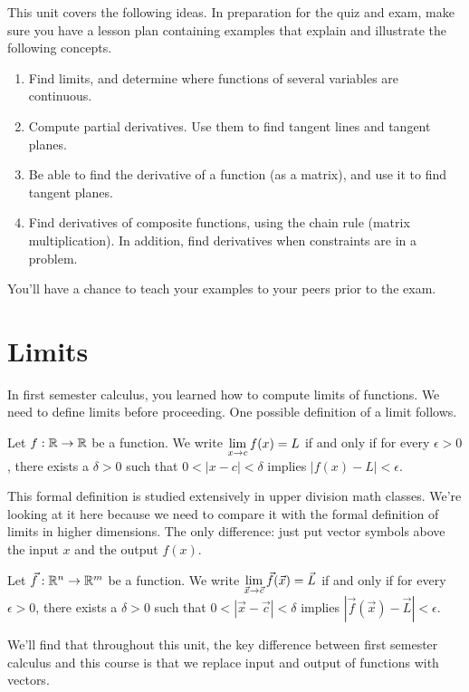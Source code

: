 \newcommand{\derivativehomeworklink}[1]{\href{http://db.tt/cSeKG8XO}{#1}}%
%
%
\noindent 
This unit covers the following ideas. In preparation for the quiz and exam, make sure you have a lesson plan containing examples that explain and illustrate the following concepts.  
\begin{enumerate}
\item Find limits, and determine where functions of several variables are continuous.
\item Compute partial derivatives.  Use them to find tangent lines and tangent planes.
\item Be able to find the derivative of a function (as a matrix), and use it to find tangent planes.
\item Find derivatives of composite functions, using the chain rule (matrix multiplication). In addition, find derivatives when constraints are in a problem.
\end{enumerate}
You'll have a chance to teach your examples to your peers prior to the exam.

\section{Limits}
In first semester calculus, you learned how to compute limits of functions. We need to define limits before proceeding. One possible definition of a limit follows.
\begin{definition}
 Let $f:\mathbb{R}\to\mathbb{R}$ be a function.
 We write $\displaystyle \lim_{x\to c} f(x)=L$ if and only if for every $\epsilon>0$, there exists a $\delta>0$ such that $0<|x-c|<\delta$ implies $|f(x)-L|<\epsilon$.
\end{definition}
 This formal definition is studied extensively in upper division math classes. We're looking at it here because we need to compare it with the formal definition of limits in higher dimensions. The only difference: just put vector symbols above the input $x$ and the output $f(x)$.
\begin{definition}
 Let $\vec f:\mathbb{R}^n\to\mathbb{R}^m$ be a function.
 We write $\displaystyle \lim_{\vec x\to \vec c} \vec f(\vec x)=\vec L$ if and only if for every $\epsilon>0$, there exists a $\delta>0$ such that $0<|\vec x-\vec c|<\delta$ implies $|\vec f(\vec x)-\vec L|<\epsilon$.
\end{definition}
We'll find that throughout this unit, the key difference between first semester calculus and this course is that we replace input and output of functions with vectors. 
 
